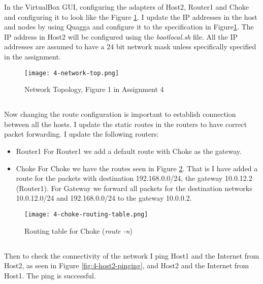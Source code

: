 \documentclass{article}
\begin{document}
In the VirtualBox GUI, configuring the adapters of Host2, Router1 and Choke and configuring it to look like the Figure \ref{fig:4-network-topology}. I update the IP addresses in the host and nodes by using Quagga and configure it to the specification in Figure\ref{fig:4-network-topology}. The IP address in Host2 will be configured using the \textit{bootlocal.sh} file. All the IP addresses are assumed to have a 24 bit network mask unless specifically specified in the assignment. 

\begin{figure}[!h]
    \texttt{[image: 4-network-top.png]}
    \label{fig:4-network-topology}
    \caption{Network Topology, Figure 1 in Assignment 4}
\end{figure}

\subsection{}

Now changing the route configuration is important to establish connection between all the hosts. I update the static routes in the routers to have correct packet forwarding. I update the following routers: 
\begin{itemize}
    \item Router1
        \subitem For Router1 we add a default route with Choke as the gateway.
    \item Choke 
        \subitem For Choke we have the routes seen in Figure {\ref{fig:4-choke-route}}.
        That is I have added a route for the packets with destination 192.168.0.0/24, the gateway 10.0.12.2 (Router1). 
        \subitem For Gateway we forward all packets for the destination networks 10.0.12.0/24 and 192.168.0.0/24 to the gateway 10.0.0.2.
\end{itemize}

\begin{figure}[!h]
    \texttt{[image: 4-choke-routing-table.png]}
    \label{fig:4-choke-route}
    \caption{Routing table for Choke (\textit{route -n})}
\end{figure}

\subsection{}
Then to check the connectivity of the network I ping Host1 and the Internet from Host2, as seen in Figure {\ref{fig:4-host2-pinging}}, and Host2 and the Internet from Host1. The ping is successful.
\end{document}
